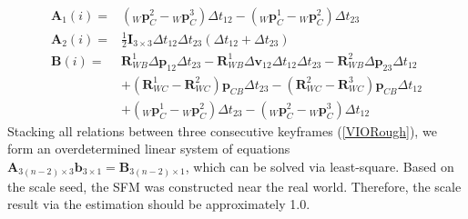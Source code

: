 \documentclass[journal,article,submit,moreauthors,pdftex]{Definitions/mdpi}
\begin{document}
\begin{equation}
	\begin{aligned}
		\boldsymbol{A}_1(i) = & ({_W}\boldsymbol{p}_C^2-{_W}\boldsymbol{p}_C^3)\Delta{t}_{12}-({_W}\boldsymbol{p}_C^1-{_W}\boldsymbol{p}_C^2)\Delta{t}_{23}                                                                             \\
		\boldsymbol{A}_2(i) = & \frac{1}{2} \boldsymbol{I}_{3\times 3} \Delta{t_{12}}\Delta{t_{23}}(\Delta{t_{12}} + \Delta{t_{23}})                                                                                                    \\
		\boldsymbol{B}(i) =   & \boldsymbol{R}_{WB}^1\Delta\boldsymbol{p}_{12}\Delta{t}_{23} -\boldsymbol{R}_{WB}^1\Delta\boldsymbol{v}_{12}\Delta{t}_{12}\Delta{t}_{23} - \boldsymbol{R}_{WB}^2\Delta\boldsymbol{p}_{23}\Delta{t}_{12} \\
		                      & +(\boldsymbol{R}_{WC}^{1}-\boldsymbol{R}_{WC}^{2}) \boldsymbol{p}_{CB}\Delta{t_{23}} - (\boldsymbol{R}_{WC}^{2}-\boldsymbol{R}_{WC}^{3}) \boldsymbol{p}_{CB}\Delta{t_{12}}                              \\
		                      & +({_W}\boldsymbol{p}_C^1-{_W}\boldsymbol{p}_C^2)\Delta{t}_{23}-({_W}\boldsymbol{p}_C^2-{_W}\boldsymbol{p}_C^3)\Delta{t}_{12}                                                                            
	\end{aligned}
	\label{VIORoughEq}
\end{equation}
Stacking all relations between three consecutive keyframes (\ref{VIORough}), we 
form an overdetermined linear system of equations $\boldsymbol{A}_{3(n-2)\times 3}\boldsymbol{b}_{3\times1} = \boldsymbol{B}_{3(n-2)\times1}$, 
which can be solved via least-square. 
Based on the scale seed, the SFM was constructed near the real world.
Therefore, the scale result via the estimation should be approximately 1.0.
\end{document}
